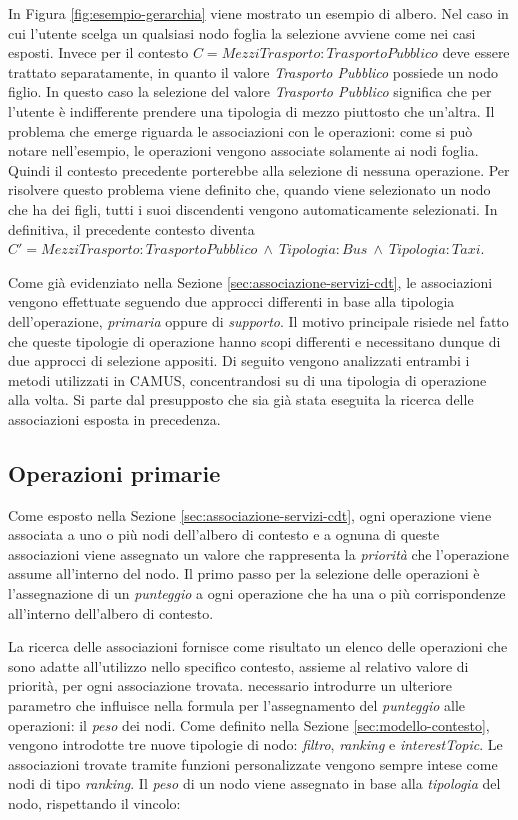 In Figura \ref{fig:esempio-gerarchia} viene mostrato un esempio di albero. Nel caso in cui l'utente scelga un qualsiasi nodo foglia la selezione avviene come nei casi esposti. Invece per il contesto $ C = MezziTrasporto: TrasportoPubblico $ deve essere trattato separatamente, in quanto il valore \emph{Trasporto Pubblico} possiede un nodo figlio. In questo caso la selezione del valore \emph{Trasporto Pubblico} significa che per l'utente è indifferente prendere una tipologia di mezzo piuttosto che un'altra. Il problema che emerge riguarda le associazioni con le operazioni: come si può notare nell'esempio, le operazioni vengono associate solamente ai nodi foglia. Quindi il contesto precedente porterebbe alla selezione di nessuna operazione. Per risolvere questo problema viene definito che, quando viene selezionato un nodo che ha dei figli, tutti i suoi discendenti vengono automaticamente selezionati. In definitiva, il precedente contesto diventa $ C' = MezziTrasporto: TrasportoPubblico\ \land\ Tipologia: Bus\ \land\ Tipologia: Taxi $.

Come già evidenziato nella Sezione \ref{sec:associazione-servizi-cdt}, le associazioni vengono effettuate seguendo due approcci differenti in base alla tipologia dell'operazione, \emph{primaria} oppure di \emph{supporto}. Il motivo principale risiede nel fatto che queste tipologie di operazione hanno scopi differenti e necessitano dunque di due approcci di selezione appositi. Di seguito vengono analizzati entrambi i metodi utilizzati in CAMUS, concentrandosi su di una tipologia di operazione alla volta. Si parte dal presupposto che sia già stata eseguita la ricerca delle associazioni esposta in precedenza.

\subsection*{Operazioni primarie}

Come esposto nella Sezione \ref{sec:associazione-servizi-cdt}, ogni operazione viene associata a uno o più nodi dell'albero di contesto e a ognuna di queste associazioni viene assegnato un valore che rappresenta la \emph{priorità} che l'operazione assume all'interno del nodo. Il primo passo per la selezione delle operazioni è l'assegnazione di un \emph{punteggio} a ogni operazione che ha una o più corrispondenze all'interno dell'albero di contesto. 

La ricerca delle associazioni fornisce come risultato un elenco delle operazioni che sono adatte all'utilizzo nello specifico contesto, assieme al relativo valore di priorità, per ogni associazione trovata. \upe necessario introdurre un ulteriore parametro che influisce nella formula per l'assegnamento del \emph{punteggio} alle operazioni: il \emph{peso} dei nodi. Come definito nella Sezione \ref{sec:modello-contesto}, vengono introdotte tre nuove tipologie di nodo: \emph{filtro}, \emph{ranking} e \emph{interestTopic}. Le associazioni trovate tramite funzioni personalizzate vengono sempre intese come nodi di tipo \emph{ranking}. Il \emph{peso} di un nodo viene assegnato in base alla \emph{tipologia} del nodo, rispettando il vincolo:

